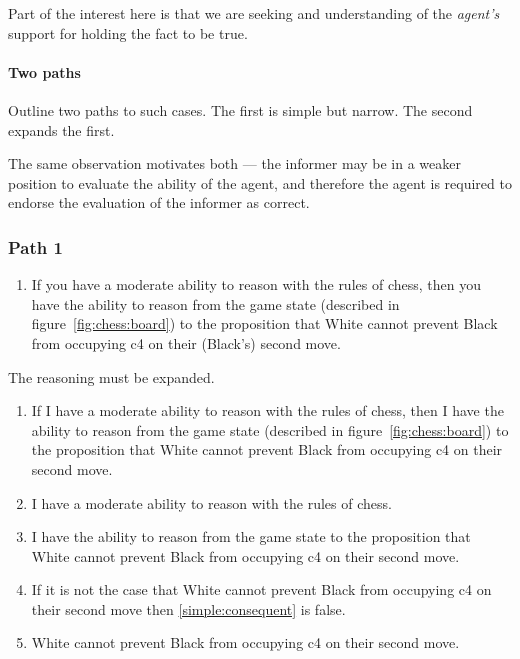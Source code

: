 \documentclass[10pt]{article}
\begin{document}
\begin{note}[Embedded]

  {
    \color{red}
    Part of the interest here is that we are seeking and understanding of the \emph{agent's} support for holding the fact to be true.
  }

\end{note}

\paragraph{Two paths}


Outline two paths to such cases.
The first is simple but narrow.
The second expands the first.

The same observation motivates both --- the informer may be in a weaker position to evaluate the ability of the agent, and therefore the agent is required to endorse the evaluation of the informer as correct.

\subsubsection{Path 1}
\label{sec:path-1}

\begin{enumerate}
\item\label{chess:claim:1:conditional} If you have a moderate ability to reason with the rules of chess, then you have the ability to reason from the game state (described in figure~\ref{fig:chess:board}) to the proposition that White cannot prevent Black from occupying c4 on their (Black's) second move.
\end{enumerate}

The reasoning must be expanded.

\begin{enumerate}
\item\label{simple:conditional:claim} If I have a moderate ability to reason with the rules of chess, then I have the ability to reason from the game state (described in figure~\ref{fig:chess:board}) to the proposition that White cannot prevent Black from occupying c4 on their second move.
\item\label{simple:conditional:antecedent} I have a moderate ability to reason with the rules of chess.
\item\label{simple:conditional:consequent} I have the ability to reason from the game state to the proposition that White cannot prevent Black from occupying c4 on their second move.
\item\label{simple:conditional:necessity} If it is not the case that White cannot prevent Black from occupying c4 on their second move then \ref{simple:consequent} is false.
\item\label{simple:conditional:focus} White cannot prevent Black from occupying c4 on their second move.
\end{enumerate}
\end{document}
